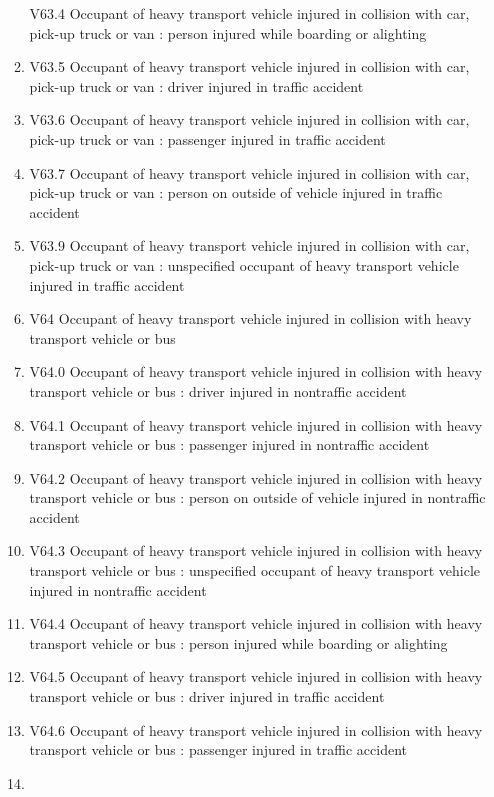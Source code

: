 \documentclass[
]{scrartcl}
\begin{document}
\begin{itemize}
\begin{enumerate}
    V63.4 Occupant of heavy transport vehicle injured in collision with
    car, pick-up truck or van : person injured while boarding or
    alighting
  \item
    V63.5 Occupant of heavy transport vehicle injured in collision with
    car, pick-up truck or van : driver injured in traffic accident
  \item
    V63.6 Occupant of heavy transport vehicle injured in collision with
    car, pick-up truck or van : passenger injured in traffic accident
  \item
    V63.7 Occupant of heavy transport vehicle injured in collision with
    car, pick-up truck or van : person on outside of vehicle injured in
    traffic accident
  \item
    V63.9 Occupant of heavy transport vehicle injured in collision with
    car, pick-up truck or van : unspecified occupant of heavy transport
    vehicle injured in traffic accident
  \item
    V64 Occupant of heavy transport vehicle injured in collision with
    heavy transport vehicle or bus
  \item
    V64.0 Occupant of heavy transport vehicle injured in collision with
    heavy transport vehicle or bus : driver injured in nontraffic
    accident
  \item
    V64.1 Occupant of heavy transport vehicle injured in collision with
    heavy transport vehicle or bus : passenger injured in nontraffic
    accident
  \item
    V64.2 Occupant of heavy transport vehicle injured in collision with
    heavy transport vehicle or bus : person on outside of vehicle
    injured in nontraffic accident
  \item
    V64.3 Occupant of heavy transport vehicle injured in collision with
    heavy transport vehicle or bus : unspecified occupant of heavy
    transport vehicle injured in nontraffic accident
  \item
    V64.4 Occupant of heavy transport vehicle injured in collision with
    heavy transport vehicle or bus : person injured while boarding or
    alighting
  \item
    V64.5 Occupant of heavy transport vehicle injured in collision with
    heavy transport vehicle or bus : driver injured in traffic accident
  \item
    V64.6 Occupant of heavy transport vehicle injured in collision with
    heavy transport vehicle or bus : passenger injured in traffic
    accident
  \item

\end{enumerate}
\end{itemize}
\end{document}
